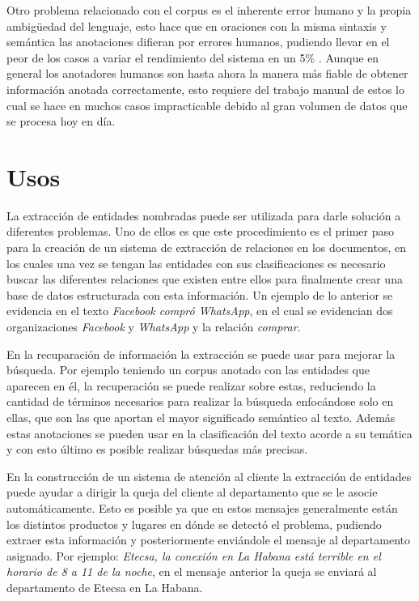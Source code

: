 \documentclass[runningheads]{llncs}
\begin{document}
Otro problema relacionado con el corpus es el inherente error humano y la propia ambigüedad del lenguaje, esto hace que en oraciones con la misma sintaxis y semántica las anotaciones difieran por errores humanos, pudiendo llevar en el peor de los casos a variar el rendimiento del sistema en un 5\% \cite{posdecisiontree}. Aunque en general los anotadores humanos son hasta ahora la manera más fiable de obtener información anotada correctamente, esto requiere del trabajo manual de estos lo cual se hace en muchos casos impracticable debido al gran volumen de datos que se procesa hoy en día.

\section{Usos}

La extracción de entidades nombradas puede ser utilizada para darle solución a diferentes problemas. Uno de ellos es que este procedimiento es el primer paso para la creación de un sistema de extracción de relaciones en los documentos, en los cuales una vez se tengan las entidades con sus clasificaciones es necesario buscar las diferentes relaciones que existen entre ellos para finalmente crear una base de datos estructurada con esta información. Un ejemplo de lo anterior se evidencia en el texto \emph{Facebook compró WhatsApp}, en el cual se evidencian dos organizaciones \emph{Facebook} y \emph{WhatsApp} y la relación \emph{comprar}.

En la recuparación de información la extracción se puede usar para mejorar la búsqueda. Por ejemplo teniendo un corpus anotado con las entidades que aparecen en él, la recuperación se puede realizar sobre estas, reduciendo la cantidad de términos necesarios para realizar la búsqueda enfocándose solo en ellas, que son las que aportan el mayor significado semántico al texto. Además estas anotaciones se pueden usar en la clasificación del texto acorde a su temática y con esto último es posible realizar búsquedas más precisas.

En la construcción de un sistema de atención al cliente la extracción de entidades puede ayudar a dirigir la queja del cliente al departamento que se le asocie automáticamente. Esto es posible ya que en estos mensajes generalmente están los distintos productos y lugares en dónde se detectó el problema, pudiendo extraer esta información y posteriormente enviándole el mensaje al departamento asignado. Por ejemplo: \emph{Etecsa, la conexión en La Habana está terrible en el horario de 8 a 11 de la noche}, en el mensaje anterior la queja se enviará al departamento de Etecsa en La Habana.
\end{document}
